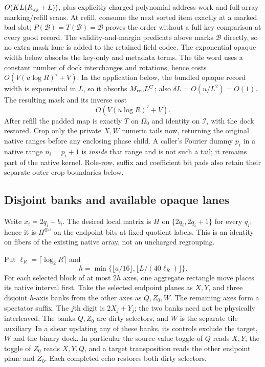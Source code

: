 $O(KL(R_{\rm op}+L))$, plus explicitly charged polynomial address
work and full-array marking/refill scans. At refill, consume the next
sorted item exactly at a marked bad slot;
$P(\mathcal B)=T(\mathcal B)=\mathcal B$ proves the
order without a full-key comparison at every good record. The
validity-and-margin predicate above marks $\mathcal B$ directly, so no extra mask lane is added
to the retained field codec. The exponential opaque width
below absorbs the key-only and metadata terms. The tile word uses
a constant number of dock interchanges and rotations, hence costs
$O(V(u\log R)^\tau+V)$.  In the application below, the bundled opaque
record width is exponential in $L$, so it absorbs $M_{\rm rec}L^C$; also
$\delta L=O(u/L^2)=O(1)$.  The resulting mask and its inverse cost
\[
                       O(V(u\log R)^\tau+V).
\]
After refill the padded map is exactly $T$ on $\Omega_0$ and identity
on $\mathcal I$, with the dock restored. Crop only the private $X,W$
numeric tails now, returning the original native ranges before any
enclosing phase child. A caller's Fourier dummy $p_i$ in a native
range $n_i=p_i+1$ is \emph{inside} that range and is not such a tail;
it remains part of the native kernel. Role-row, suffix and coefficient
bit pads also retain their separate outer crop boundaries below.

\subsection{Disjoint banks and available opaque lanes}
Write $x_i=2q_i+b_i$. The desired local matrix is $H$ on
$\{2q_i,2q_i+1\}$ for every $q_i$; hence it is $H^{\otimes a}$
on the endpoint bits at fixed quotient labels. This is an identity
on fibers of the existing native array, not an uncharged regrouping.

Put $\ell_R=\lceil\log_2R\rceil$ and
\[
 h=\min\{\lfloor a/16\rfloor,\lfloor L/(40\ell_R)\rfloor\}.
\]
For each selected block of at most $2h$ axes, one aggregate rectangle
move places its native interval first. Take the selected endpoint
planes as $X,Y$, and three disjoint $h$-axis banks from the other
axes as $Q,Z_0,W$. The remaining axes form a spectator suffix.
The $j$th digit is $2X_j+Y_j$; the two banks need not be physically
interleaved. The banks $Q,Z_0$ are dirty selectors, and $W$ is the
separate tile auxiliary. In a shear updating any of these banks,
its controls exclude the target, $W$ and the binary dock. In particular
the source-value toggle of $Q$ reads $X,Y$, the toggle of $Z_0$
reads $X,Y,Q$, and a target transposition reads the other endpoint
plane and $Z_0$. Each completed echo restores both dirty selectors.


